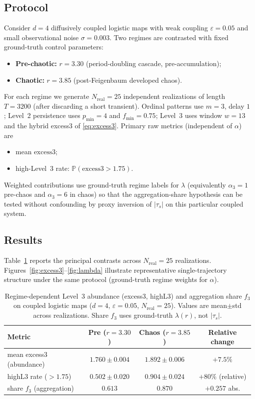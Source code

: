 \documentclass[11pt,a4paper]{article}
\begin{document}
\subsection{Protocol}

Consider $d=4$ diffusively coupled logistic maps with weak coupling
$\varepsilon=0.05$ and small observational noise $\sigma=0.003$. Two
regimes are contrasted with fixed ground-truth control parameters:
\begin{itemize}[leftmargin=*,itemsep=2pt]
  \item \textbf{Pre-chaotic:} $r=3.30$ (period-doubling cascade,
  pre-accumulation);
  \item \textbf{Chaotic:} $r=3.85$ (post-Feigenbaum developed chaos).
\end{itemize}
For each regime we generate $N_{\mathrm{real}}=25$ independent
realizations of length $T=3200$ (after discarding a short transient).
Ordinal patterns use $m=3$, delay $1$; Level~2 persistence uses
$p_{\min}=4$ and $f_{\min}=0.75$; Level~3 uses window $w=13$ and the
hybrid excess3 of \eqref{eq:excess3}. Primary raw metrics (independent
of $\alpha$) are
\begin{itemize}[leftmargin=*,itemsep=1pt]
  \item mean $\mathrm{excess3}$;
  \item high-Level~3 rate:
  $\mathbb{P}(\mathrm{excess3}>1.75)$.
\end{itemize}
Weighted contributions use ground-truth regime labels for $\lambda$
(equivalently $\alpha_3=1$ pre-chaos and $\alpha_3=6$ in chaos) so that
the aggregation-share hypothesis can be tested without confounding by
proxy inversion of $|\tau_s|$ on this particular coupled system.

\subsection{Results}

Table~\ref{tab:synthetic} reports the principal contrasts across
$N_{\mathrm{real}}=25$ realizations. Figures~\ref{fig:excess3}--\ref{fig:lambda}
illustrate representative single-trajectory structure under the same
protocol (ground-truth regime weights for $\alpha$).

\begin{table}[t]
\centering
\caption{Regime-dependent Level~3 abundance (excess3, highL3) and
aggregation share $f_3$ on coupled logistic maps
($d=4$, $\varepsilon=0.05$, $N_{\mathrm{real}}=25$). Values are
mean$\pm$std across realizations. Share $f_3$ uses ground-truth
$\lambda(r)$, not $|\tau_s|$.}
\label{tab:synthetic}
\begin{tabular}{@{}lccc@{}}
\toprule
Metric & Pre ($r=3.30$) & Chaos ($r=3.85$) & Relative change \\
\midrule
mean excess3 (abundance)
  & $1.760\pm 0.004$
  & $1.892\pm 0.006$
  & $+7.5\%$ \\
highL3 rate ($>1.75$)
  & $0.502\pm 0.020$
  & $0.904\pm 0.024$
  & $+80\%$ (relative) \\
share $f_3$ (aggregation)
  & $0.613$
  & $0.870$
  & $+0.257$ abs. \\
\bottomrule
\end{tabular}
\end{table}
\end{document}
